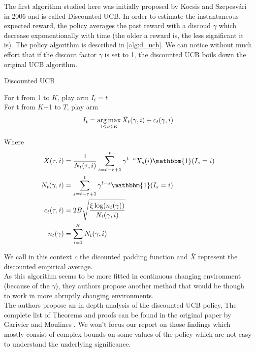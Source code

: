 The first algorithm studied here was initially proposed by Kocsis and Szepesvári in 2006 \cite{Kocsis06banditbased} and is called Discounted UCB. In order to estimate the instantaneous expected reward, the policy averages the past reward with a discoud $\gamma$ which decrease exponentionally with time (the older a reward is, the less significant it is).  The policy algorithm is described in \ref{alg:d_ucb}. We can notice without much effort that if the discout factor $\gamma$ is set to 1, the discounted UCB boils down the original UCB algorithm.\\

\begin{algorithm}[ht]
    \caption{Discounted UCB}
    \label{alg:d_ucb}
    For t from 1 to $K$, play arm $I_t = t$ \\
    For t from $K$+1 to $T$, play arm 
    $$ I_t = \operatorname*{arg\,max}_{1\leq i \leq K} \bar X_t(\gamma,i) + c_t(\gamma,i)$$
\end{algorithm}

Where
\begin{align}
\bar{X}(\tau, i) &= \frac{1}{N_t(\tau, i)}
\sum_{s=t-\tau+1}^t \gamma^{t-s}X_s(i)\mathbbm{1}(I_s=i)\\
N_t(\gamma, i) &= \sum_{s=t-\tau+1}^t \gamma^{t-s}\mathbbm{1}(I_s=i)\\
c_t(\tau, i) &= 2B\sqrt{\frac{\xi \log(n_t(\gamma))}{N_t(\gamma,i)}}\\
n_t(\gamma) &= \sum_{i=1}^K N_t(\gamma,i)
\end{align}

We call in this context $c$ the dicounted padding function and $\bar X$ represent the discounted empirical average.\\
As this algorithm seems to be more fitted in continuous changing environment (because of the $\gamma$), they authors propose another method that would be though to work in more abruptly changing environments.\\

The authors propose an in depth analysis of the discounted UCB policy,  The complete list of Theorems and proofs can be found in the original paper by Garivier and Moulines \cite{garivier2008upperconfidence}. We won't focus our report on those findings which mostly consist of complex bounds on some values of the policy which are not easy to understand the underlying significance.
